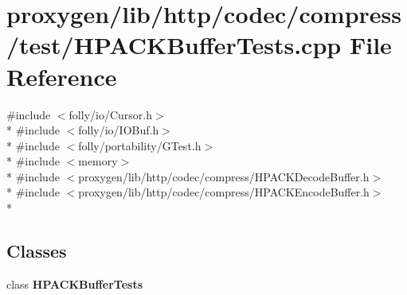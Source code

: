 \section{proxygen/lib/http/codec/compress/test/\+H\+P\+A\+C\+K\+Buffer\+Tests.cpp File Reference}
\label{HPACKBufferTests_8cpp}
{\ttfamily \#include $<$folly/io/\+Cursor.\+h$>$}\\*
{\ttfamily \#include $<$folly/io/\+I\+O\+Buf.\+h$>$}\\*
{\ttfamily \#include $<$folly/portability/\+G\+Test.\+h$>$}\\*
{\ttfamily \#include $<$memory$>$}\\*
{\ttfamily \#include $<$proxygen/lib/http/codec/compress/\+H\+P\+A\+C\+K\+Decode\+Buffer.\+h$>$}\\*
{\ttfamily \#include $<$proxygen/lib/http/codec/compress/\+H\+P\+A\+C\+K\+Encode\+Buffer.\+h$>$}\\*
\subsection*{Classes}
\begin{DoxyCompactItemize}
\item 
class {\bf H\+P\+A\+C\+K\+Buffer\+Tests}
\end{DoxyCompactItemize}
